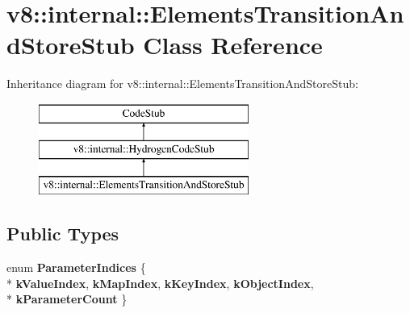 \hypertarget{classv8_1_1internal_1_1_elements_transition_and_store_stub}{}\section{v8\+:\+:internal\+:\+:Elements\+Transition\+And\+Store\+Stub Class Reference}
\label{classv8_1_1internal_1_1_elements_transition_and_store_stub}
Inheritance diagram for v8\+:\+:internal\+:\+:Elements\+Transition\+And\+Store\+Stub\+:\begin{figure}[H]
\begin{center}
\leavevmode
\includegraphics[height=3.000000cm]{classv8_1_1internal_1_1_elements_transition_and_store_stub}
\end{center}
\end{figure}
\subsection*{Public Types}
\begin{DoxyCompactItemize}
\item 
\hypertarget{classv8_1_1internal_1_1_elements_transition_and_store_stub_aca723ce150c2a513ba5ed6fec3fe1189}{}enum {\bfseries Parameter\+Indices} \{ \\*
{\bfseries k\+Value\+Index}, 
{\bfseries k\+Map\+Index}, 
{\bfseries k\+Key\+Index}, 
{\bfseries k\+Object\+Index}, 
\\*
{\bfseries k\+Parameter\+Count}
 \}\label{classv8_1_1internal_1_1_elements_transition_and_store_stub_aca723ce150c2a513ba5ed6fec3fe1189}

\end{DoxyCompactItemize}
